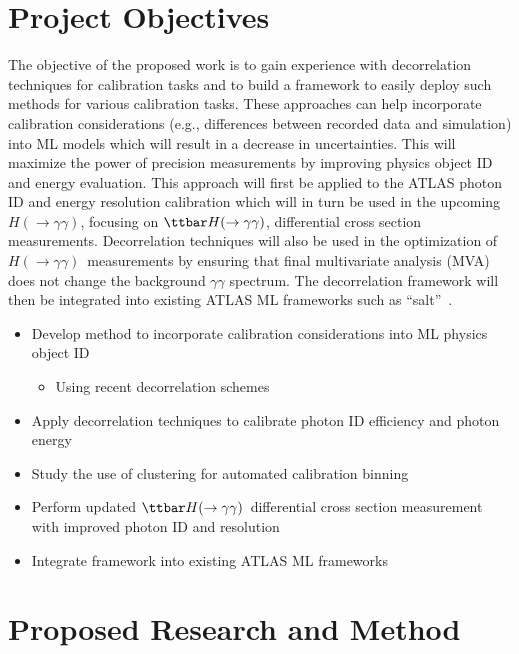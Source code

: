 \documentclass[letter, USenglish, 11pt, subfigure]{article}
\newcommand{\tthyy}{\ensuremath{\ttbar H(\to\gamma\gamma)}}
\newcommand{\hyy}{\ensuremath{H(\to\gamma\gamma)}}
\begin{document}
\section{Project Objectives}
The objective of the proposed work is to gain experience with decorrelation techniques for calibration tasks and to build a framework to easily deploy such methods for various calibration tasks. These approaches can help incorporate calibration considerations (e.g., differences between recorded data and simulation) into ML models which will result in a decrease in uncertainties. This will maximize the power of precision measurements by improving physics object ID and energy evaluation. This approach will first be applied to the ATLAS photon ID and energy resolution calibration which will in turn be used in the upcoming \hyy, focusing on \tthyy, differential cross section measurements. Decorrelation techniques will also be used in the optimization of \hyy\ measurements by ensuring that final multivariate analysis (MVA) does not change the background $\gamma\gamma$ spectrum. The decorrelation framework will then be integrated into existing ATLAS ML frameworks such as ``salt''~\cite{salt}.
\begin{itemize}
\item Develop method to incorporate calibration considerations into ML physics object ID
  \begin{itemize}
  \item Using recent decorrelation schemes
  \end{itemize}
\item Apply decorrelation techniques to calibrate photon ID efficiency and photon energy 
\item Study the use of clustering for automated calibration binning
\item Perform updated \tthyy\ differential cross section measurement with improved photon ID and resolution
\item Integrate framework into existing ATLAS ML frameworks
\end{itemize}

\section{Proposed Research and Method}
\end{document}
